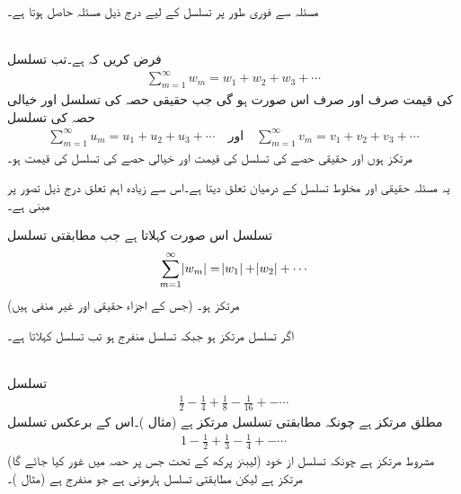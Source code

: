 مسئلہ  سے  فوری طور پر تسلسل کے لیے درج ذیل مسئلہ حاصل ہوتا ہے۔

\quad {}\\
فرض کریں کہ  ہے۔تب تسلسل
\begin{align*}
\sum_{m=1}^{\infty} w_m=w_1+w_2+w_3+\cdots
\end{align*}
کی قیمت صرف اور صرف اس صورت  ہو گی جب حقیقی حصہ کی تسلسل اور خیالی حصہ کی تسلسل 
\begin{align*}
\sum_{m=1}^{\infty} u_m=u_1+u_2+u_3+\cdots\quad \text{اور}\quad \sum_{m=1}^{\infty} v_m=v_1+v_2+v_3+\cdots
\end{align*}
مرتکز ہوں اور حقیقی حصے کی تسلسل کی قیمت  اور خیالی حصے کی تسلسل کی قیمت   ہو۔

یہ مسئلہ حقیقی اور مخلوط تسلسل کے درمیان تعلق دیتا ہے۔اس سے زیادہ اہم تعلق درج ذیل تصور پر مبنی ہے۔ 

تسلسل  اس صورت   کہلاتا ہے جب مطابقتی تسلسل
\begin{align}\label{مساوات_ترتیب_مطلق_مرتکز}
\sum_{m=1}^{\infty} \abs{w_m}=\abs{w_1}+\abs{w_2}+\cdots
\end{align}
(جس کے اجزاء حقیقی اور غیر منفی ہیں) مرتکز ہو۔

اگر تسلسل  مرتکز ہو جبکہ  تسلسل  منفرج ہو تب تسلسل    کہلاتا ہے۔

\quad {}\\
تسلسل
\begin{align*}
\frac{1}{2}-\frac{1}{4}+\frac{1}{8}-\frac{1}{16}+-\cdots
\end{align*}
مطلق مرتکز ہے چونکہ مطابقتی تسلسل  مرتکز ہے (مثال )۔اس کے برعکس تسلسل
\begin{align*}
1-\frac{1}{2}+\frac{1}{3}-\frac{1}{4}+-\cdots
\end{align*}
مشروط مرتکز ہے چونکہ تسلسل از خود  (لیبنز پرکھ  کے تحت جس پر حصہ  میں غور کیا جائے گا)   مرتکز ہے لیکن مطابقتی تسلسل  ہارمونی ہے جو منفرج ہے (مثال )۔

